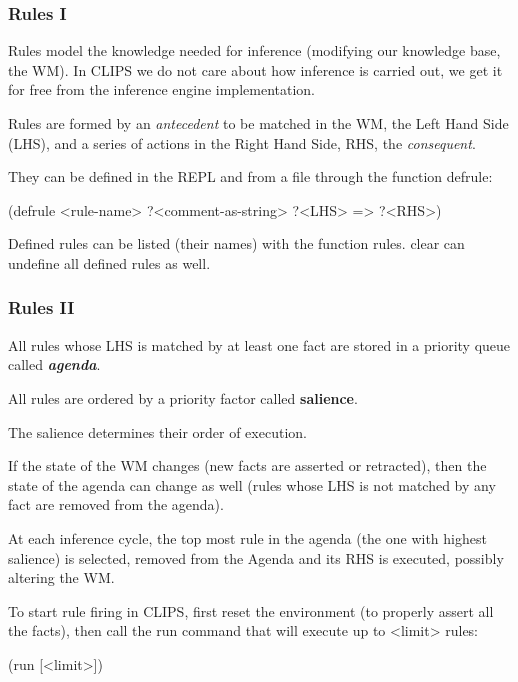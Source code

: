 \documentclass[xcolor={usenames,dvipsnames,svgnames}, compress]{beamer}
\begin{document}
\begin{frame}[fragile]
  \frametitle{Rules I}
  Rules model the knowledge needed for inference (modifying our
  knowledge base, the WM). 
  In CLIPS we do not
  care about how inference is carried out, we get it for free from the
  inference engine implementation.\par\bigskip
  
  Rules are formed by an \emph{antecedent} to be matched in the WM,
  the \textsf{L}eft \textsf{H}and \textsf{S}ide (LHS), and a series of
  actions in the \textsf{R}ight \textsf{H}and \textsf{S}ide,
  \textsf{RHS}, the  \emph{consequent}.\par\bigskip
  They can be defined in the
  REPL and from a file through the function \textsf{defrule}:
  \begin{clips-code}[numbers=none]
    (defrule <rule-name>
    ?<comment-as-string>
    ?<LHS>
    =>
    ?<RHS>)
  \end{clips-code}\bigskip

  Defined rules can be listed (their names) with the function
  \textsf{rules}. \textsf{clear} can undefine all defined rules as well.\par\bigskip
\end{frame}

\begin{frame}[fragile]
  \frametitle{Rules II}

  All rules whose \textsf{LHS} is matched by at least one fact are
  stored in a priority queue called
  \emph{\textbf{agenda}}.\par
  All rules are ordered by a priority factor
  called \textbf{salience}.\par
  The salience determines their order of execution.\par\bigskip

  If the state of the WM changes (new facts are asserted or
  retracted), then the state of the \textsf{agenda} can change as well (rules
  whose LHS is not matched by any fact are removed from the agenda).\par\bigskip
  
  At each inference cycle, the top most rule in the \textsf{agenda} (the one
  with highest salience) is selected, removed from the Agenda and its
  \textsf{RHS} is executed, possibly altering the WM.
  
  To start rule firing in CLIPS, first reset the environment (to
  properly assert all the facts), then call the \textsf{run} command
  that will execute up to <limit> rules:
  \begin{clips-code}[numbers=none]
    (run [<limit>])
  \end{clips-code}
  
\end{frame}
\end{document}
